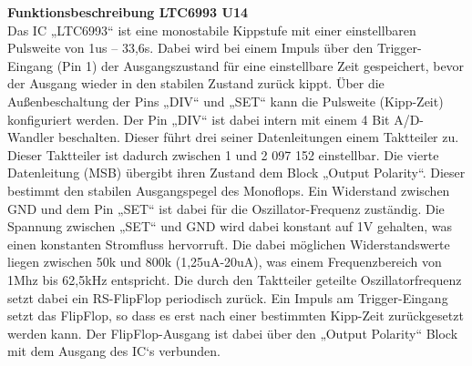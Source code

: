 \textbf{Funktionsbeschreibung LTC6993 U14}
\\
Das IC „LTC6993“ ist eine monostabile Kippstufe mit einer einstellbaren Pulsweite von 1us – 33,6s. Dabei wird bei einem Impuls über den Trigger-Eingang (Pin 1) der Ausgangszustand für eine einstellbare Zeit gespeichert, bevor der Ausgang wieder in den stabilen Zustand zurück kippt. Über die Außenbeschaltung der Pins „DIV“ und „SET“ kann die Pulsweite (Kipp-Zeit) konfiguriert werden. Der Pin „DIV“ ist dabei intern mit einem 4 Bit A/D-Wandler beschalten. Dieser führt drei seiner Datenleitungen einem Taktteiler zu. Dieser Taktteiler ist dadurch zwischen 1 und 2 097 152 einstellbar. Die vierte Datenleitung (MSB) übergibt ihren Zustand dem Block „Output Polarity“. Dieser bestimmt den stabilen Ausgangspegel des Monoflops. Ein Widerstand zwischen GND und dem Pin „SET“ ist dabei für die Oszillator-Frequenz zuständig. Die Spannung zwischen „SET“ und GND wird dabei konstant auf 1V gehalten, was einen konstanten Stromfluss hervorruft. Die dabei möglichen Widerstandswerte liegen zwischen 50k und 800k (1,25uA-20uA), was einem Frequenzbereich von 1Mhz bis 62,5kHz entspricht. Die durch den Taktteiler geteilte Oszillatorfrequenz setzt dabei ein RS-FlipFlop periodisch zurück. Ein Impuls am Trigger-Eingang setzt das FlipFlop, so dass es erst nach einer bestimmten Kipp-Zeit zurückgesetzt werden kann. Der FlipFlop-Ausgang ist dabei über den „Output Polarity“ Block mit dem Ausgang des IC‘s verbunden.

\newpage

